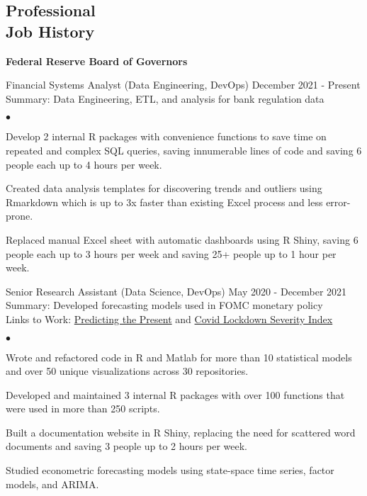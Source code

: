 \documentclass[margin, line]{res}
\newenvironment{list2}{
  \begin{list}{$\bullet$}{%
      \setlength{\itemsep}{0in}
      \setlength{\parsep}{0in} \setlength{\parskip}{0in}
      \setlength{\topsep}{0in} \setlength{\partopsep}{0in} 
      \setlength{\leftmargin}{\dimexpr 26pt-0.05in}}}
    {\end{list}}
\begin{document}
\begin{resume}
\section{\sc Professional \\ Job History}
{\bf Federal Reserve Board of Governors}\\

\vspace{-.65cm}

Financial Systems Analyst (Data Engineering, DevOps) \hfill December 2021 - Present\\
\hspace*{3mm}
    Summary: Data Engineering, ETL, and analysis for bank regulation data
    \hspace{5cm}
    \begin{list2}
        \item Develop 2 internal R packages with convenience functions to save time on repeated and complex SQL queries, saving innumerable lines of code and saving 6 people each up to 4 hours per week.
        \item Created data analysis templates for discovering trends and outliers using Rmarkdown which is up to 3x faster than existing Excel process and less error-prone.
        \item Replaced manual Excel sheet with automatic dashboards using R Shiny, saving 6 people each up to 3 hours per week and saving 25+ people up to 1 hour per week.
    \end{list2}


Senior Research Assistant (Data Science, DevOps) \hfill May 2020 - December 2021\\
\hspace*{3mm}
    Summary: Developed forecasting models used in FOMC monetary policy\\
\hspace*{3mm}
    Links to Work:  \href{https://michaelboerman.medium.com/predicting-the-present-a56ff704af0b}{Predicting the Present} and   \href{https://github.com/michaelboerman/lockdown_severity_index#readme}{Covid Lockdown Severity Index}
    
    \begin{list2}
        \item Wrote and refactored code in R and Matlab for more than 10 statistical models and over 50 unique visualizations across 30 repositories.
        \item Developed and maintained 3 internal R packages with over 100 functions that were used in more than 250 scripts.
        \item Built a documentation website in R Shiny, replacing the need for scattered word documents and saving 3 people up to 2 hours per week.
        \item Studied econometric forecasting models using state-space time series, factor models, and ARIMA.
\end{list2}



\end{resume}
\end{document}
